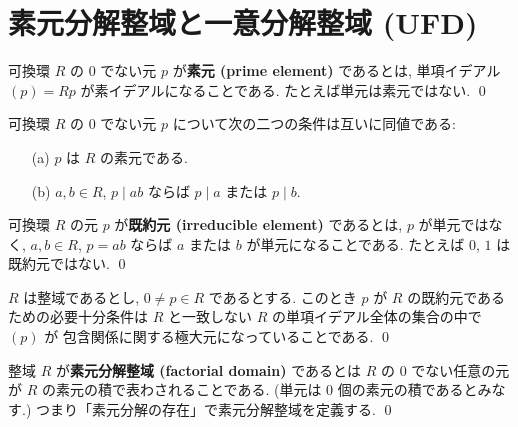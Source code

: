 \documentclass[12pt,twoside]{jarticle}
\begin{document}

\section{素元分解整域と一意分解整域 (UFD)}


\begin{definition}[素元]
 可換環 $R$ の $0$ でない元 $p$ が{\bf 素元 (prime element)} であるとは, %
 単項イデアル $(p)=Rp$ が素イデアルになることである.
 たとえば単元は素元ではない.
 \qed
\end{definition}

\begin{question}[素元の定義の確認, 簡単]
 可換環 $R$ の $0$ でない元 $p$ について次の二つの条件は互いに同値である:
 \begin{enumerate}
 \item[(a)] $p$ は $R$ の素元である.
 \item[(b)] $a,b\in R$, $p\mid ab$ ならば $p\mid a$ または $p\mid b$.
 \end{enumerate}
\end{question}

\begin{definition}[既約元]
 可換環 $R$ の元 $p$ が{\bf 既約元 (irreducible element)} であるとは, %
 $p$ が単元ではなく, 
 $a,b\in R$, $p=ab$ ならば $a$ または $b$ が単元になることである.
 たとえば $0$, $1$ は既約元ではない.
 \qed
\end{definition}

\begin{question}[単項イデアルの言葉による既約元の特徴づけ, 簡単]
 $R$ は整域であるとし, $0\ne p\in R$ であるとする.
 このとき $p$ が $R$ の既約元であるための必要十分条件は %
 $R$ と一致しない $R$ の単項イデアル全体の集合の中で $(p)$ が
 包含関係に関する極大元になっていることである.
 \qed
\end{question}


\begin{definition}[素元分解整域]
 整域 $R$ が{\bf 素元分解整域 (factorial domain)} であるとは %
 $R$ の $0$ でない任意の元が $R$ の素元の積で表わされることである.
 (単元は $0$ 個の素元の積であるとみなす.)
 つまり「素元分解の存在」で素元分解整域を定義する.
 \qed
\end{definition}
\end{document}
